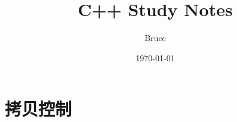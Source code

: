 \documentclass{article}
\title{C++ Study Notes}
\author{Bruce}
\date{\today}
\begin{document}
\maketitle
\tableofcontents

\section{拷贝控制}

\end{document}
